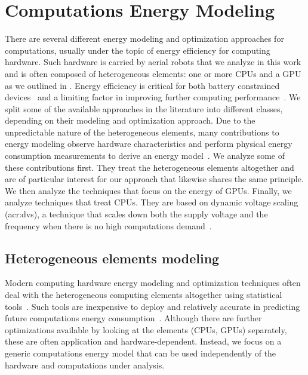 \section{Computations Energy Modeling}
\label{sec:soa-ene-mod}

There are several different energy modeling and optimization approaches for computations, usually under the topic of energy efficiency for computing hardware. 
Such hardware is carried by aerial robots that we analyze in this work and is often composed of heterogeneous elements: one or more CPUs and a GPU as we outlined in . Energy efficiency is critical for both battery constrained devices~\citep{seewald202Xenergy} and a limiting factor in improving further computing performance~\citep{horowitz2014computing}. We split some of the available approaches in the literature into different classes, depending on their modeling and optimization approach. Due to the unpredictable nature of the heterogeneous elements, many contributions to energy modeling observe hardware characteristics and perform physical energy consumption measurements to derive an energy model~\citep{teamplay}. We analyze some of these contributions first. They treat the heterogeneous elements altogether and are of particular interest for our approach that likewise shares the same principle. We then analyze the techniques that focus on the energy of GPUs. Finally, we analyze techniques that treat CPUs. They are based on dynamic voltage scaling (\Gls{acr:dvs}), a technique that scales down both the supply voltage and the frequency when there is no high computations demand~\citep{flautner2001automatic, chen2009fundamentals}.

\subsection{Heterogeneous elements modeling}

Modern computing hardware energy modeling and optimization techniques often deal with the heterogeneous computing elements altogether using statistical tools~\citep{teamplay}. Such tools are inexpensive to deploy and relatively accurate in predicting future computations energy consumption~\citep{seewald2019coarse}. Although there are further optimizations available by looking at the elements (CPUs, GPUs) separately, these are often application and hardware-dependent. Instead, we focus on a generic computations energy model that can be used independently of the hardware and computations under analysis. 


